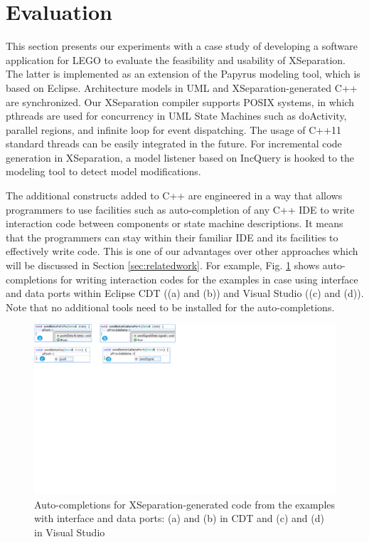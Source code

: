 \section{Evaluation}
\label{sec:evaluation}
This section presents our experiments with a case study of developing a software application for LEGO to evaluate the feasibility and usability of XSeparation.
The latter is implemented as an extension of the Papyrus modeling tool, which is based on Eclipse.
Architecture models in UML and XSeparation-generated C++ are synchronized.
Our XSeparation compiler supports POSIX systems, in which pthreads are used for concurrency in UML State Machines such as doActivity, parallel regions, and infinite loop for event dispatching.
The usage of C++11 standard threads can be easily integrated in the future.
For incremental code generation in XSeparation, a model listener based on IncQuery is hooked to the modeling tool to detect model modifications.

The additional constructs added to C++ are engineered in a way that allows programmers to use facilities such as auto-completion of any C++ IDE to write interaction code between components or state machine descriptions.
It means that the programmers can stay within their familiar IDE and its facilities to effectively write code.
This is one of our advantages over other approaches which will be discussed in Section \ref{sec:relatedwork}. 
For example, Fig. \ref{fig:autocompletion} shows auto-completions for writing interaction codes for the examples in case using interface and data ports within Eclipse CDT ((a) and (b)) and Visual Studio ((c) and (d)).
Note that no additional tools need to be installed for the auto-completions.

\begin{figure}
	\centering
	\includegraphics[clip, trim=0cm 14.6cm 17.7cm 0cm, width=\columnwidth]{figures/autocompletion.pdf}
	\caption{Auto-completions for XSeparation-generated code from the examples with interface and data ports: (a) and (b) in CDT and (c) and (d) in Visual Studio} 
	\label{fig:autocompletion}
\end{figure}

